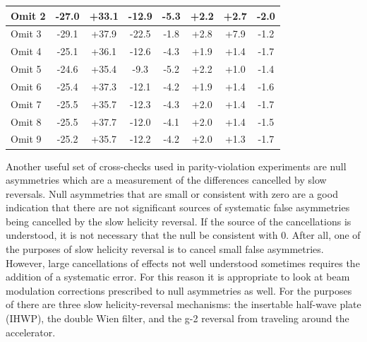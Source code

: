 \begin{table}[!h]
\begin{center}
\begin{tabular}[h]{|l||c|c|c|c|c|c||c|}
Omit 2& -27.0& +33.1& -12.9& -5.3& +2.2& +2.7& -2.0\\\hline
{\color{Gray}Omit 3}&{\color{Gray} -29.1}&{\color{Gray} +37.9}&{\color{Gray} -22.5}&{\color{Gray} -1.8}&{\color{Gray} +2.8}&{\color{Gray} +7.9}&{\color{Gray} -1.2}\\\hline
Omit 4& -25.1& +36.1& -12.6& -4.3& +1.9& +1.4& -1.7\\\hline
Omit 5& -24.6& +35.4& -9.3& -5.2& +2.2& +1.0& -1.4\\\hline
Omit 6& -25.4& +37.3& -12.1& -4.2& +1.9& +1.4& -1.6\\\hline
Omit 7& -25.5& +35.7& -12.3& -4.3& +2.0& +1.4& -1.7\\\hline
Omit 8& -25.5& +37.7& -12.0& -4.1& +2.0& +1.4& -1.5\\\hline
Omit 9& -25.2& +35.7& -12.2& -4.2& +2.0& +1.3& -1.7\\\hline
\end{tabular}
\end{center}
\label{tab:run2_dithering_corrections_table}
\end{table}

Another useful set of cross-checks used in parity-violation experiments are null asymmetries which are a measurement of the differences cancelled by slow reversals. Null asymmetries that are small or consistent with zero are a good indication that there are not significant sources of systematic false asymmetries being cancelled by the slow helicity reversal. If the source of the cancellations is understood, it is not necessary that the null be consistent with 0. After all, one of the purposes of slow helicity reversal is to cancel small false asymmetries. However, large cancellations of effects not well understood sometimes requires the addition of a systematic error. For this reason it is appropriate to look at beam modulation corrections prescribed to null asymmetries as well. For the purposes of \Qs there are three slow helicity-reversal mechanisms: the insertable half-wave plate (IHWP), the double Wien filter, and the g-2 reversal from traveling around the accelerator.

